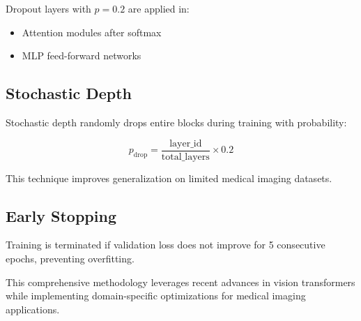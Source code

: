 Dropout layers with $p = 0.2$ are applied in:
\begin{itemize}
    \item Attention modules after softmax
    \item MLP feed-forward networks
\end{itemize}

\subsection{Stochastic Depth}

Stochastic depth randomly drops entire blocks during training with probability:

\begin{equation}
p_{\text{drop}} = \frac{\text{layer\_id}}{\text{total\_layers}} \times 0.2
\end{equation}

This technique improves generalization on limited medical imaging datasets.

\subsection{Early Stopping}

Training is terminated if validation loss does not improve for 5 consecutive epochs, preventing overfitting.

This comprehensive methodology leverages recent advances in vision transformers while implementing domain-specific optimizations for medical imaging applications.

